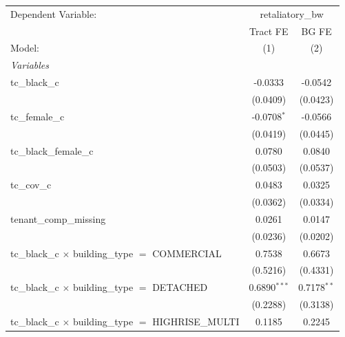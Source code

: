 \begin{tabular}{lcc}
   \tabularnewline \midrule \midrule
   Dependent Variable: & \multicolumn{2}{c}{retaliatory\_bw}\\
                                                                       & Tract FE       & BG FE \\   
   Model:                                                              & (1)            & (2)\\  
   \midrule
   \emph{Variables}\\
   tc\_black\_c                                                        & -0.0333        & -0.0542\\   
                                                                       & (0.0409)       & (0.0423)\\   
   tc\_female\_c                                                       & -0.0708$^{*}$  & -0.0566\\   
                                                                       & (0.0419)       & (0.0445)\\   
   tc\_black\_female\_c                                                & 0.0780         & 0.0840\\   
                                                                       & (0.0503)       & (0.0537)\\   
   tc\_cov\_c                                                          & 0.0483         & 0.0325\\   
                                                                       & (0.0362)       & (0.0334)\\   
   tenant\_comp\_missing                                               & 0.0261         & 0.0147\\   
                                                                       & (0.0236)       & (0.0202)\\   
   tc\_black\_c $\times$ building\_type $=$ COMMERCIAL                 & 0.7538         & 0.6673\\   
                                                                       & (0.5216)       & (0.4331)\\   
   tc\_black\_c $\times$ building\_type $=$ DETACHED                   & 0.6890$^{***}$ & 0.7178$^{**}$\\   
                                                                       & (0.2288)       & (0.3138)\\   
   tc\_black\_c $\times$ building\_type $=$ HIGHRISE\_MULTI            & 0.1185         & 0.2245\\   

\end{tabular}
